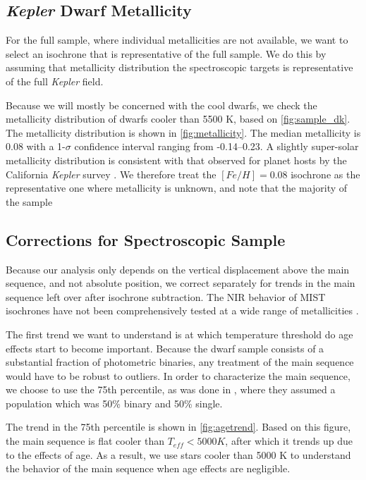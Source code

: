 \documentclass[manuscript]{aastex6}
\newcommand{\Kepler}{\mbox{\textit{Kepler}}}
\newcommand{\Teff}{\ensuremath{T_{eff}}}
\begin{document}
\subsection{\Kepler{} Dwarf Metallicity}

For the full \citet{McQuillan14} sample, where individual metallicities are not
available, we want to select an isochrone that is representative of the full 
sample. We do this by assuming that metallicity distribution the spectroscopic 
targets is representative of the full \Kepler{} field. 

Because we will mostly be concerned with the cool dwarfs, we check the
metallicity distribution of dwarfs cooler than 5500 K, based on 
\cref{fig:sample_dk}. The metallicity distribution is shown in
\cref{fig:metallicity}. The median metallicity is 0.08 with a 1-\(\sigma\)
confidence interval ranging from -0.14--0.23. A slightly super-solar
metallicity distribution is consistent with that observed for planet hosts by 
the California \Kepler{} survey \citep{Petigura17}.  We therefore treat the \([Fe/H] =
0.08\) isochrone as the representative one where metallicity is unknown, and
note that the majority of the sample 

\subsection{Corrections for Spectroscopic Sample}

Because our analysis only depends on the vertical displacement above the main
sequence, and not absolute position, we correct separately for trends in the
main sequence left over after isochrone subtraction. The NIR behavior of MIST 
isochrones have not been comprehensively tested at a wide range of 
metallicities \citep{Choi18}.

The first trend we want to understand is at which temperature threshold do age
effects start to become important. Because the dwarf sample consists of a
substantial fraction of photometric binaries, any treatment of the main
sequence would have to be robust to outliers. In order to characterize the main
sequence, we choose to use the 75th percentile, as was done in
\citep{Mermillod92}, where they assumed a population which was 50\% binary and
50\% single. 

The trend in the 75th percentile is shown in \cref{fig:agetrend}. Based on this
figure, the main sequence is flat cooler than \(\Teff < 5000 K\), after which
it trends up due to the effects of age. As a result, we use stars cooler than
5000 K to understand the behavior of the main sequence when age effects are
negligible.
\end{document}
